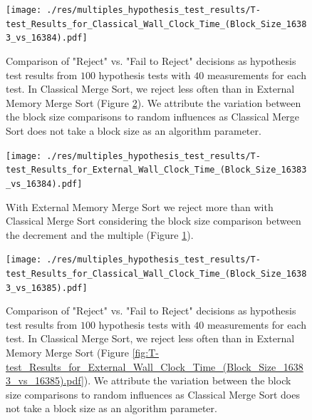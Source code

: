 \documentclass[twocolumn]{article}
\begin{document}
\begin{figure}[htb]
    \begin{minipage}{0.475 \textwidth}
        \centering
        \texttt{[image: ./res/multiples\_hypothesis\_test\_results/T-test\_Results\_for\_Classical\_Wall\_Clock\_Time\_(Block\_Size\_16383\_vs\_16384).pdf]}
        \caption{Comparison of "Reject" vs. "Fail to Reject" decisions as hypothesis test results from \( 100 \) hypothesis tests with \( 40 \) measurements for each test.
            In Classical Merge Sort, we reject less often than in External Memory Merge Sort (Figure \ref{fig:T-test_Results_for_External_Wall_Clock_Time_(Block_Size_16383_vs_16384).pdf}).
            We attribute the variation between the block size comparisons to random influences as Classical Merge Sort does not take a block size as an algorithm parameter.}
        \label{fig:T-test_Results_for_Classical_Wall_Clock_Time_(Block_Size_16383_vs_16384).pdf}
    \end{minipage}
\end{figure}

\begin{figure}[htb]
    \begin{minipage}{0.475 \textwidth}
        \centering
        \texttt{[image: ./res/multiples\_hypothesis\_test\_results/T-test\_Results\_for\_External\_Wall\_Clock\_Time\_(Block\_Size\_16383\_vs\_16384).pdf]}
        \caption{With External Memory Merge Sort we reject more than with Classical Merge Sort considering the block size comparison between the decrement and the multiple (Figure \ref{fig:T-test_Results_for_Classical_Wall_Clock_Time_(Block_Size_16383_vs_16384).pdf}).}
        \label{fig:T-test_Results_for_External_Wall_Clock_Time_(Block_Size_16383_vs_16384).pdf}
    \end{minipage}
\end{figure}

\begin{figure}[htb]
    \begin{minipage}{0.475 \textwidth}
        \centering
        \texttt{[image: ./res/multiples\_hypothesis\_test\_results/T-test\_Results\_for\_Classical\_Wall\_Clock\_Time\_(Block\_Size\_16383\_vs\_16385).pdf]}
        \caption{Comparison of "Reject" vs. "Fail to Reject" decisions as hypothesis test results from \( 100 \) hypothesis tests with \( 40 \) measurements for each test.
            In Classical Merge Sort, we reject less often than in External Memory Merge Sort (Figure \ref{fig:T-test_Results_for_External_Wall_Clock_Time_(Block_Size_16383_vs_16385).pdf}).
            We attribute the variation between the block size comparisons to random influences as Classical Merge Sort does not take a block size as an algorithm parameter.}
        \label{fig:T-test_Results_for_Classical_Wall_Clock_Time_(Block_Size_16383_vs_16385).pdf}
    \end{minipage}
\end{figure}
\end{document}
